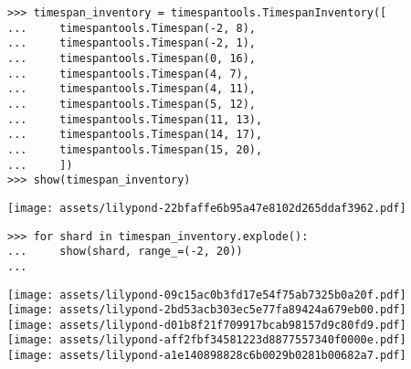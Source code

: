 \begin{comment}
<abjad>
timespan_inventory = timespantools.TimespanInventory([
    timespantools.Timespan(-2, 8),
    timespantools.Timespan(-2, 1),
    timespantools.Timespan(0, 16),
    timespantools.Timespan(4, 7),
    timespantools.Timespan(4, 11),
    timespantools.Timespan(5, 12),
    timespantools.Timespan(11, 13),
    timespantools.Timespan(14, 17),
    timespantools.Timespan(15, 20),
    ])
show(timespan_inventory)
for shard in timespan_inventory.explode():
    show(shard, range_=(-2, 20))

</abjad>
\end{comment}

\begin{abjadbookoutput}
\begin{singlespacing}
\vspace{-0.5\baselineskip}
\begin{verbatim}
>>> timespan_inventory = timespantools.TimespanInventory([
...     timespantools.Timespan(-2, 8),
...     timespantools.Timespan(-2, 1),
...     timespantools.Timespan(0, 16),
...     timespantools.Timespan(4, 7),
...     timespantools.Timespan(4, 11),
...     timespantools.Timespan(5, 12),
...     timespantools.Timespan(11, 13),
...     timespantools.Timespan(14, 17),
...     timespantools.Timespan(15, 20),
...     ])
>>> show(timespan_inventory)
\end{verbatim}
\noindent\texttt{[image: assets/lilypond-22bfaffe6b95a47e8102d265ddaf3962.pdf]}
\begin{verbatim}
>>> for shard in timespan_inventory.explode():
...     show(shard, range_=(-2, 20))
...
\end{verbatim}
\noindent\texttt{[image: assets/lilypond-09c15ac0b3fd17e54f75ab7325b0a20f.pdf]}\\
\noindent\texttt{[image: assets/lilypond-2bd53acb303ec5e77fa89424a679eb00.pdf]}\\
\noindent\texttt{[image: assets/lilypond-d01b8f21f709917bcab98157d9c80fd9.pdf]}\\
\noindent\texttt{[image: assets/lilypond-aff2fbf34581223d8877557340f0000e.pdf]}\\
\noindent\texttt{[image: assets/lilypond-a1e140898828c6b0029b0281b00682a7.pdf]}
\end{singlespacing}
\end{abjadbookoutput}

